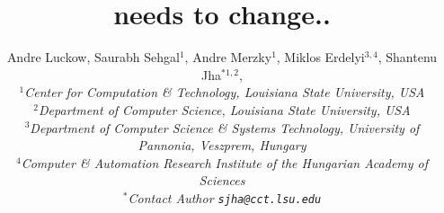 \documentclass[3p,twocolumn]{elsarticle}
\begin{document}
\title{needs to change..}
\author{Andre Luckow, Saurabh Sehgal$^1$, Andre Merzky$^{1}$, Miklos
  Erdelyi$^{3,4}$, Shantenu Jha$^{*1,2}$,
  \\
  \small{\emph{$^{1}$Center for Computation \& Technology, Louisiana State University, USA}}\\
  \small{\emph{$^{2}$Department of Computer Science, Louisiana State University, USA}}\\
  \small{\emph{$^{3}$Department of Computer Science \& Systems
      Technology, University of
      Pannonia, Veszprem, Hungary}}\\
  \small{\emph{$^{4}$Computer \& Automation Research Institute of the
      Hungarian Academy of
      Sciences}}\\
  \small{\emph{$^{*}$Contact Author \texttt{sjha@cct.lsu.edu}}}
  \upp\upp\upp\upp\upp }

\newif\ifdraft
\drafttrue
\ifdraft
 \newcommand{\amnote}[1]{     {\textcolor{magenta} { ***AM: #1 }}}
 \newcommand{\jhanote}[1]{    {\textcolor{red}     { ***SJ: #1 }}}
 \newcommand{\miklosnote}[1]{ {\textcolor{blue}    { ***ME: #1 }}}
 \newcommand{\ssnote}[1]{     {\textcolor{blue}    { ***SS: #1 }}}
 \newcommand{\alnote}[1]{     {\textcolor{blue}    { ***AL: #1 }}}
\else
 \newcommand{\amnote}[1]{}
 \newcommand{\jhanote}[1]{}
 \newcommand{\miklosnote}[1]{}
 \newcommand{\ssnote}[1]{}
  \newcommand{\alnote}[1]{}
\fi

\newcommand{\sagamapreduce}{SAGA-MapReduce\xspace}
\newcommand{\smr}{\sagamapreduce}
\newcommand{\mr}{MapReduce\xspace}
\newcommand{\tc}{$T_c$\xspace}
\newcommand{\wc}{wordcount\xspace}
\newcommand{\Wc}{Wordcount\xspace}

\newcommand{\dn}{\vspace*{0.33em}}
\newcommand{\dnn}{\vspace*{0.66em}}
\newcommand{\dnnn}{\vspace*{1em}}
\newcommand{\uppp}{\vspace*{-1em}}
\newcommand{\upp}{\vspace*{-0.66em}}
\newcommand{\up}{\vspace*{-0.33em}}
\newcommand{\shift}{\hspace*{1.00em}}

\newcommand{\T}[1]{\texttt{#1}}
\newcommand{\I}[1]{\textit{#1}}
\newcommand{\B}[1]{\textbf{#1}}
\newcommand{\F}[1]{\B{[FIXME: #1]}}
\newcommand{\TODO}[1]{\textcolor{red}{\B{TODO: #1}}}
\end{document}
